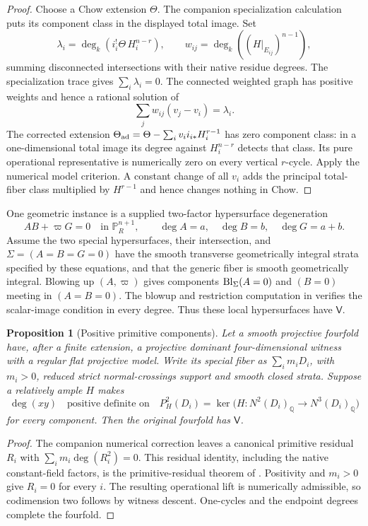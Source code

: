 \documentclass[11pt,a4paper]{article}
\newtheorem{proposition}[theorem]{Proposition}
\theoremstyle{definition}
\theoremstyle{remark}\newtheorem{remark}[theorem]{Remark}
\numberwithin{equation}{section}
\newcommand{\Q}{\mathbb Q}\newcommand{\R}{\mathbb R}\newcommand{\C}{\mathbb C}
\newcommand{\PP}{\mathbb P}\newcommand{\LL}{\mathbb L}
\begin{document}
\begin{proof}
Choose a Chow extension $\Theta$. The companion specialization
calculation puts its component class in the displayed total image.
Set
\[
 \lambda_i=\deg_k(i_i^!\Theta\,H_i^{n-r}),\qquad
 w_{ij}=\deg_k((H|_{E_{ij}})^{n-1}),
\]
summing disconnected intersections with their native residue degrees.
The specialization trace gives $\sum_i\lambda_i=0$.
The connected weighted graph has positive weights and hence a rational
solution of
\[
 \sum_jw_{ij}(v_j-v_i)=\lambda_i.
\]
The corrected extension
$\Theta_{\rm ad}=\Theta-\sum_i v_i i_{i*}H_i^{r-1}$ has zero
component class: in a one-dimensional total image its degree against
$H_i^{n-r}$ detects that class. Its pure operational representative
is numerically zero on every vertical $r$-cycle. Apply the numerical
model criterion. A constant change of all $v_i$ adds the principal
total-fiber class multiplied by $H^{r-1}$ and hence changes nothing
in Chow.
\end{proof}

One geometric instance is a supplied two-factor hypersurface
degeneration
\begin{equation}\label{eq:two-factor-model}
 AB+\varpi G=0\quad\text{in }\PP^{n+1}_R,
 \qquad\deg A=a,\quad\deg B=b,\quad\deg G=a+b.
\end{equation}
Assume the two special hypersurfaces, their intersection, and
$\Sigma=(A=B=G=0)$ have the smooth transverse geometrically
integral strata specified by these equations, and that the generic
fiber is smooth geometrically integral. Blowing up $(A,\varpi)$
gives components $\operatorname{Bl}_\Sigma(A=0)$ and $(B=0)$ meeting in
$(A=B=0)$. The blowup and restriction computation in
\cite{InternalModelCriteria} verifies the scalar-image condition in
every degree. Thus these local hypersurfaces have $\mathsf V$.

\begin{proposition}[Positive primitive components]\label{prop:positive-model}
Let a smooth projective fourfold have, after a finite extension, a
projective dominant four-dimensional witness with a regular flat
projective model. Write its special fiber as $\sum_i m_iD_i$, with
$m_i>0$, reduced strict normal-crossings support and smooth closed
strata. Suppose a relatively ample $H$ makes
\[
 \deg(xy)\quad\text{positive definite on}\quad
 P_H^2(D_i)=\ker\bigl(H:N^2(D_i)_\Q\to N^3(D_i)_\Q\bigr)
\]
for every component. Then the original fourfold has $\mathsf V$.
\end{proposition}

\begin{proof}
The companion numerical correction leaves a canonical primitive
residual $R_i$ with
$\sum_i m_i\deg(R_i^2)=0$. This residual identity, including the
native constant-field factors, is the primitive-residual theorem of
\cite{InternalModelCriteria}. Positivity and $m_i>0$ give $R_i=0$
for every $i$. The resulting operational lift is numerically
admissible, so codimension two follows by witness descent.
One-cycles and the endpoint degrees complete the fourfold.
\end{proof}
\end{document}
